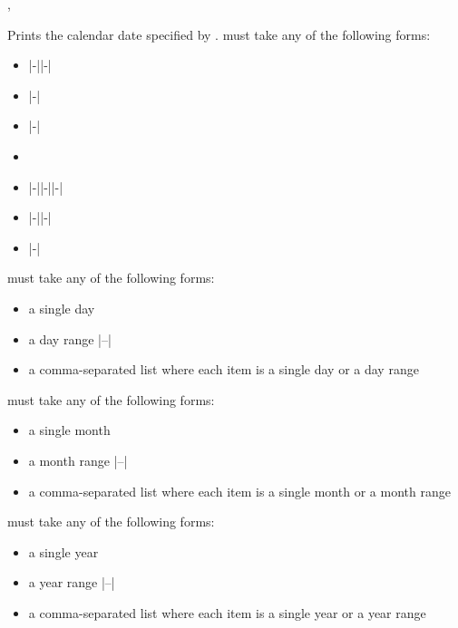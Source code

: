 \documentclass{beerydoc}
\begin{document}


\begin{codedoc}{\calendardate, \Calendardate}
  \begin{syntax}
      
  \end{syntax}
  Prints the calendar date specified by .
   must take any of the following forms:
  \begin{itemize}
    \item {}|-||-|
    \item {}|-|
    \item {}|-|
    \item {}
    \item {}|-||-||-|
    \item {}|-||-|
    \item {}|-|
  \end{itemize}

   must take any of the following forms:
  \begin{itemize}
    \item a single day 
    \item a day range |--|
    \item a comma-separated list where each item is a single day or a day range
  \end{itemize}

   must take any of the following forms:
  \begin{itemize}
    \item a single month 
    \item a month range |--|
    \item
    a comma-separated list where each item is a single month or a month range
  \end{itemize}

   must take any of the following forms:
  \begin{itemize}
    \item a single year 
    \item a year range |--|
    \item
    a comma-separated list where each item is a single year or a year range
  \end{itemize}


\end{codedoc}
\end{document}
